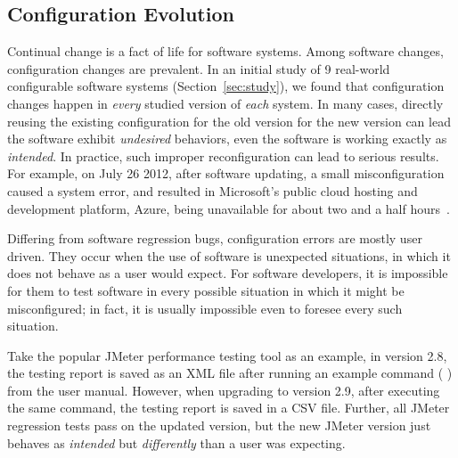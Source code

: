 \subsection{Configuration Evolution}
\label{sec:evolerror}

Continual change is a fact of life for software systems.
Among software changes, configuration changes are prevalent.
In an initial study of 9 real-world configurable software
systems (Section~\ref{sec:study}),
we found that configuration changes happen in \textit{every} studied
version of \textit{each} system. In many 
cases, directly reusing the existing configuration
for the old version for the new
version can lead the software exhibit \textit{undesired} behaviors,
even the software is working exactly as \textit{intended}.
In practice, such improper reconfiguration can lead to serious results.
For example, on July 26 2012, after software updating,
a small misconfiguration caused a system error, and resulted in
Microsoft's public cloud hosting and development platform, Azure,
being unavailable for about two and a half hours~\cite{msdown}.



Differing from software regression bugs, configuration errors are mostly user driven.
They occur when the use of software is unexpected
situations, in which it does not behave as a user would expect.
For software developers,
it is impossible for them to test software in every possible
situation in which it might be misconfigured; in fact, it is usually
impossible even to foresee every such situation. 


Take the popular JMeter performance testing tool as an example, 
in version 2.8, the testing report is saved as an XML
file after running an example command (
)
from the user manual.
However, when upgrading to version 2.9, 
after executing the same command, the testing report is saved
in a CSV file. Further, all JMeter regression tests pass 
on the updated version, but the new JMeter version
just behaves as \textit{intended} but \textit{differently}
than a user was expecting.


